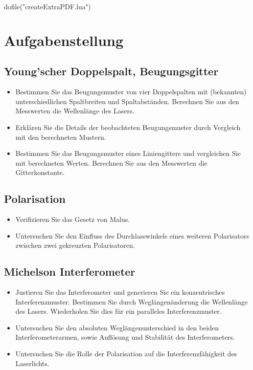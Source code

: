 \documentclass[12pt,english,ngerman]{scrartcl}
\begin{document}
\begin{luacode*}
dofile("createExtraPDF.lua")
\end{luacode*}

%
\tableofcontents

\newpage

\section{Aufgabenstellung}\label{Auf}

\subsection{Young'scher Doppelspalt, Beugungsgitter}

\begin{itemize}
	\item Bestimmen Sie das Beugungsmuster von vier Doppelspalten mit (bekannten) unterschiedlichen 
    Spaltbreiten und Spaltabständen. Berechnen Sie aus den Messwerten die Wellenlänge des Lasers.
	\item Erklären Sie die Details der beobachteten Beugungsmuster durch Vergleich mit den berechneten Mustern.
	\item Bestimmen Sie das Beugungsmuster eines Liniengitters und vergleichen Sie mit berechneten Werten. 
    Berechnen Sie aus den Messwerten die Gitterkonstante.
\end{itemize}

\subsection{Polarisation}

\begin{itemize}
	\item Verifizieren Sie das Gesetz von Malus.
	\item Untersuchen Sie den Einfluss des Durchlasswinkels eines weiteren Polarisators zwischen zwei gekreuzten Polarisatoren.
\end{itemize}

\subsection{Michelson Interferometer}

\begin{itemize}
	\item Justieren Sie das Interferometer und generieren Sie ein konzentrisches Interferenzmuster. 
    Bestimmen Sie durch Weglängenänderung die Wellenlänge 
    des Lasers. Wiederholen Sie dies für ein paralleles Interferenzmuster.
	\item Untersuchen Sie den absoluten Weglängenunterschied in den beiden Interferometerarmen, 
    sowie Auflösung und Stabilität des Interferometers.
	\item Untersuchen Sie die Rolle der Polarisation auf die Interferenzfähigkeit des Laserlichts.
\end{itemize}
\end{document}

